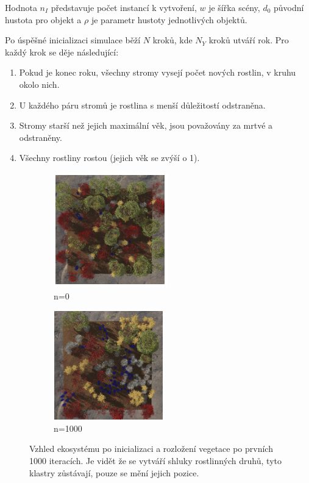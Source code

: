 Hodnota $n_I$ představuje počet instancí k vytvoření, $w$ je šířka scény, $d_0$ původní hustota pro objekt a $\rho$ je parametr hustoty jednotlivých objektů.

Po úspěšné inicializaci simulace běží $N$ kroků, kde $N_Y$ kroků utváří rok. Pro každý krok se děje následující:

\begin{enumerate}
	\item Pokud je konec roku, všechny stromy vysejí počet nových rostlin, v kruhu okolo nich.
	\item U každého páru stromů je rostlina s menší důležitostí odstraněna.
	\item Stromy starší než jejich maximální věk, jsou považovány za mrtvé a odstraněny.
	\item Všechny rostliny rostou (jejich věk se zvýší o 1).
\end{enumerate}


\begin{figure}[h]
	\centering
	\begin{subfigure}{0.475\textwidth}
		\centering
		\includegraphics[scale=1]{obrazky-figures/treesStart.png}
		\caption{n=0}
	\end{subfigure}
	\begin{subfigure}{0.475\textwidth}
		\centering
		\includegraphics[scale=1]{obrazky-figures/treesEnd.png}
		\caption{n=1000}
	\end{subfigure}
	\caption[generatedTrees]{Vzhled ekosystému po inicializaci a rozložení vegetace po prvních 1000 iteracích. Je vidět že se vytváří shluky rostlinných druhů, tyto klastry zůstávají, pouze se mění jejich pozice.}
\end{figure}

